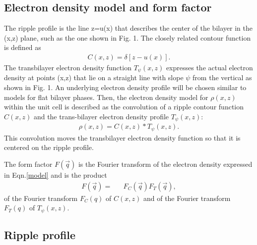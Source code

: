 \subsection{Electron density model and form factor}

The ripple profile is the line z=u(x) that describes the center of the bilayer 
in the (x,z) plane, such as the one shown in Fig. 1.  
The closely related contour function is defined as
\begin{eqnarray}
\label{contour}
C(x,z) = \delta [z - u(x)].
\end{eqnarray}
The transbilayer electron density function $T_{\psi}(x,z)$ expresses the
actual electron density at points (x,z) that lie on a straight line with
slope $\psi$ from the vertical as shown in Fig. 1.  An underlying electron
density profile will be chosen similar to models for flat bilayer phases.
Then, the electron density model for $\rho (x,z)$ within
the unit cell is described as the convolution of a ripple contour
function $C(x,z)$ and the trans-bilayer electron density profile $T_{\psi}(x,z)$:
\begin{eqnarray}
\label{model}
\rho (x,z) = C(x,z) \ast T_{\psi}(x,z).
\end{eqnarray}
This convolution moves the transbilayer electron density function so that
it is centered on the ripple profile.

The form factor $F(\vec{q})$ is the Fourier transform of the electron density
expressed in Eqn.\ref{model} and is the product
\begin{eqnarray}
\label{formall}
F(\vec{q}) =&& F_C(\vec{q}) F_T(\vec{q}),
\end{eqnarray}
of the Fourier transform $F_{C}(q)$ of $C(x,z)$ and of the Fourier transform
$F_{T}(q)$ of $T_{\psi}(x,z)$.

\subsection{Ripple profile}

